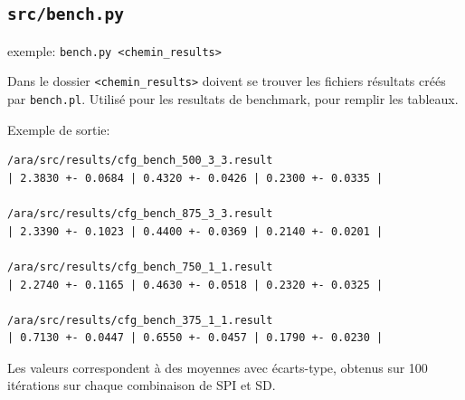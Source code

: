 \documentclass[a4paper]{article}
\begin{document}
\begin{appendix}
    \subsection{\texttt{src/bench.py}}
    exemple: \texttt{bench.py <chemin\_results>}

    Dans le dossier \texttt{<chemin\_results>} doivent se trouver les fichiers résultats créés par \texttt{bench.pl}. Utilisé pour les resultats de benchmark, pour remplir les tableaux.

Exemple de sortie:
\begin{verbatim}
/ara/src/results/cfg_bench_500_3_3.result
| 2.3830 +- 0.0684 | 0.4320 +- 0.0426 | 0.2300 +- 0.0335 |

/ara/src/results/cfg_bench_875_3_3.result
| 2.3390 +- 0.1023 | 0.4400 +- 0.0369 | 0.2140 +- 0.0201 |

/ara/src/results/cfg_bench_750_1_1.result
| 2.2740 +- 0.1165 | 0.4630 +- 0.0518 | 0.2320 +- 0.0325 |

/ara/src/results/cfg_bench_375_1_1.result
| 0.7130 +- 0.0447 | 0.6550 +- 0.0457 | 0.1790 +- 0.0230 |
\end{verbatim}
Les valeurs correspondent à des moyennes avec écarts-type, obtenus sur
100 itérations sur chaque combinaison de SPI et SD.

\end{appendix}
\end{document}

